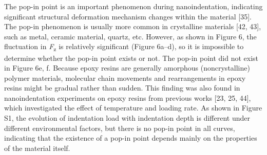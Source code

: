 \documentclass{article}
\begin{document}
The pop-in point is an important phenomenon during nanoindentation, indicating significant structural deformation mechanism changes within the material [35]. The pop-in phenomenon is usually more common in crystalline materials [42, 43], such as metal, ceramic material, quartz, etc. However, as shown in Figure 6, the fluctuation in \emph{F}\textsubscript{z} is relatively significant (Figure 6a–d), so it is impossible to determine whether the pop-in point exists or not. The pop-in point did not exist in Figure 6e, f. Because epoxy resins are generally amorphous (noncrystalline) polymer materials, molecular chain movements and rearrangements in epoxy resins might be gradual rather than sudden. This finding was also found in nanoindentation experiments on epoxy resins from previous works [23, 25, 44], which investigated the effect of temperature and loading rate. As shown in Figure S1, the evolution of indentation load with indentation depth is different under different environmental factors, but there is no pop-in point in all curves, indicating that the existence of a pop-in point depends mainly on the properties of the material itself.
\end{document}
